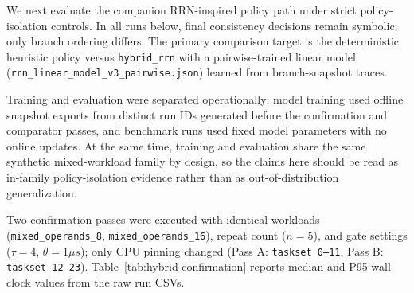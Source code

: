 \documentclass[preprint,12pt,times]{elsarticle}
\begin{document}
We next evaluate the companion RRN-inspired policy path under strict policy-isolation controls. In all runs below, final consistency decisions remain symbolic; only branch ordering differs. The primary comparison target is the deterministic heuristic policy versus \texttt{hybrid\_rrn} with a pairwise-trained linear model (\texttt{rrn\_linear\_model\_v3\_pairwise.json}) learned from branch-snapshot traces.

Training and evaluation were separated operationally: model training used offline snapshot exports from distinct run IDs generated before the confirmation and comparator passes, and benchmark runs used fixed model parameters with no online updates. At the same time, training and evaluation share the same synthetic mixed-workload family by design, so the claims here should be read as in-family policy-isolation evidence rather than as out-of-distribution generalization.

Two confirmation passes were executed with identical workloads (\texttt{mixed\_operands\_8}, \texttt{mixed\_operands\_16}), repeat count (\(n=5\)), and gate settings (\(\tau=4\), \(\theta=1\mu s\)); only CPU pinning changed (Pass A: \texttt{taskset 0--11}, Pass B: \texttt{taskset 12--23}). Table~\ref{tab:hybrid-confirmation} reports median and P95 wall-clock values from the raw run CSVs.

\begin{table}[htbp]
\centering
\caption{Hybrid pairwise-policy confirmation passes (median/P95 wall-clock in ms; lower is better)}
\label{tab:hybrid-confirmation}
\end{table}
\end{document}
